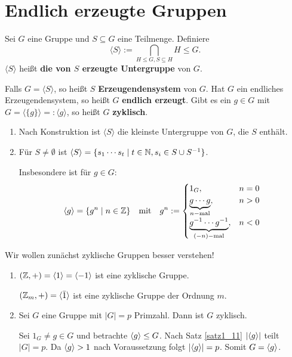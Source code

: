 \section{Endlich erzeugte Gruppen}

\begin{definition}
	Sei $G$ eine Gruppe und $S \subseteq G$ eine Teilmenge. Definiere 
	\[\langle S \rangle := \bigcap_{H \leq G, S \subseteq H} H \leq G.\]
	$\langle S \rangle$ heißt \textbf{die von $S$ erzeugte Untergruppe} von $G$.
\end{definition}
Falls $G = \langle S \rangle$, so heißt $S$ \textbf{Erzeugendensystem} von $G$. Hat $G$ ein endliches Erzeugendensystem, so heißt $G$ \textbf{endlich erzeugt}. Gibt es ein $g \in G$ mit $G = \langle \{g\} \rangle =: \langle g \rangle$, so heißt $G$ \textbf{zyklisch}.
\begin{rem}
	\begin{enumerate}[label=(\roman*)]
		\item Nach Konstruktion ist $\langle S\rangle$ die kleinste Untergruppe von $G$, die $S$ enthält.
		\item Für $S \neq \emptyset$ ist $\langle S \rangle = \{s_1 \cdots s_t \mid t \in \mathbb{N}, s_i \in S \cup S^{-1}\}$. 
		
		Insbesondere ist für $g \in G$:
		\[\langle g \rangle = \{g^n \mid n \in \mathbb{Z}\} \quad\text{mit}\quad g^n := \begin{cases}
			1_G, & n = 0\\
			\underbrace{g \cdots g}_{n-\text{mal}}, & n > 0\\
			\underbrace{g^{-1} \cdots g^{-1}}_{(-n)-\text{mal}}, & n < 0 
		\end{cases}\]
\end{enumerate}
\begin{leftbar}
	Wir wollen zunächst zyklische Gruppen besser verstehen!
\end{leftbar}
\end{rem}
\begin{beispiel}\label{beispiel2_3}
	\begin{enumerate}[label=(\arabic*)]
		\item $(\mathbb{Z}, +) = \langle 1 \rangle = \langle -1 \rangle$ ist eine zyklische Gruppe.
		
		$(\mathbb{Z}_m, +) = \langle \bar{1} \rangle$ ist eine zyklische Gruppe der Ordnung $m$.
		
		\item Sei $G$ eine Gruppe mit $|G| = p$ Primzahl. Dann ist $G$ zyklisch.
		\begin{inlproof}
			Sei $1_G \neq g \in G$ und betrachte $\langle g \rangle \leq G$. Nach Satz \ref{satz1_11} $|\langle g \rangle|$ teilt $|G| = p$. Da $\langle g \rangle > 1$ nach Voraussetzung folgt $|\langle g \rangle| = p$. Somit $G = \langle g \rangle$.
		\end{inlproof}
	\end{enumerate}
\end{beispiel}
